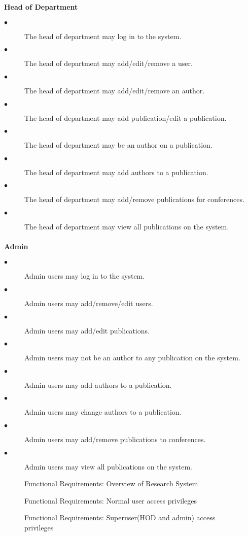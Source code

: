 \documentclass[a4paper]{article}
\begin{document}
	\paragraph{\textbf{Head of Department}}
	\begin{description}
		\item[$\bullet$] The head of department may log in to the system.
		\item[$\bullet$] The head of department may add/edit/remove a user.
		\item[$\bullet$] The head of department may add/edit/remove an author.
		\item[$\bullet$] The head of department may add publication/edit a publication.
		\item[$\bullet$] The head of department may be an author on a publication.
		\item[$\bullet$] The head of department may add authors to a publication.
		\item[$\bullet$] The head of department may add/remove publications for conferences.
		\item[$\bullet$] The head of department may view all publications on the system.
	\end{description}
	\paragraph{\textbf{Admin}}
	\begin{description}
		\item[$\bullet$] Admin users may log in to the system.
		\item[$\bullet$] Admin users may add/remove/edit users.
		\item[$\bullet$] Admin users may add/edit publications.
		\item[$\bullet$] Admin users may not be an author to any publication on the system.
		\item[$\bullet$] Admin users may add authors to a publication.
		\item[$\bullet$] Admin users may change authors to a publication.
		\item[$\bullet$] Admin users may add/remove publications to conferences.
		\item[$\bullet$] Admin users may view all publications on the system.
	\end{description}
	\begin{figure}[H]
		\caption{Functional Requirements: Overview of Research System \label{overflow}}
	\end{figure}
	\begin{figure}[H]
		\caption{Functional Requirements: Normal user access privileges \label{overflow}}
	\end{figure}
	\begin{figure}[H]
		\caption{Functional Requirements: Superuser(HOD and admin) access privileges \label{overflow}}
	\end{figure}
	\pagebreak
\end{document}

